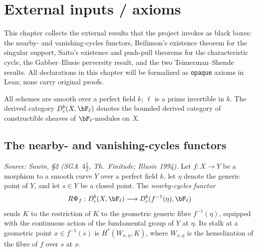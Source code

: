 
\section{External inputs / axioms}

This chapter collects the external results that the project invokes as black boxes:
the nearby- and vanishing-cycles functors, Beilinson's existence theorem for the
singular support, Saito's existence and push-pull theorems for the characteristic
cycle, the Gabber--Illusie perversity result, and the two Tsimerman--Shende results.
All declarations in this chapter will be formalized as \texttt{opaque} axioms in
Lean; none carry original proofs.

All schemes are smooth over a perfect field $k$; $\ell$ is a prime invertible in
$k$.  The derived category $D^b_c(X,\bF_\ell)$ denotes the bounded derived category
of constructible sheaves of $\bF_\ell$-modules on $X$.

\subsection{The nearby- and vanishing-cycles functors}

\begin{definition}
  \label{def:nearby_cycles}
  \textit{Source: Sawin, §2 (SGA~$4\tfrac{1}{2}$, Th.\ Finitude; Illusie 1994).}
  Let $f:X\to Y$ be a morphism to a smooth curve $Y$ over a perfect field $k$, let
  $\eta$ denote the generic point of $Y$, and let $s\in Y$ be a closed point.  The
  \emph{nearby-cycles functor}
  \[ R\Psi_f : D^b_c(X,\bF_\ell) \longrightarrow D^b_c(f^{-1}(\eta),\bF_\ell) \]
  sends $K$ to the restriction of $K$ to the geometric generic fibre $f^{-1}(\eta)$,
  equipped with the continuous action of the fundamental group of $Y$ at $\eta$.  Its
  stalk at a geometric point $x\in f^{-1}(s)$ is $H^*(W_{x,\eta},K)$, where
  $W_{x,\eta}$ is the henselization of the fibre of $f$ over $s$ at $x$.
\end{definition}

